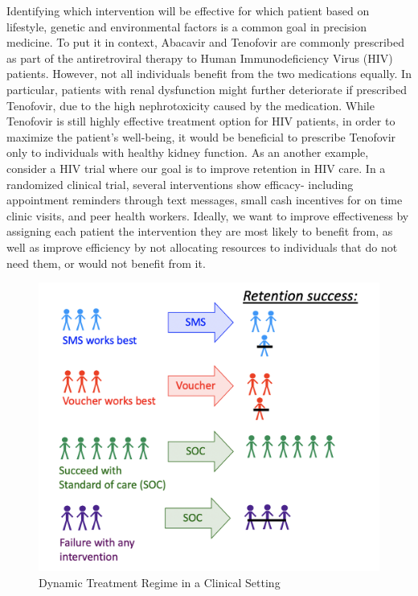 \documentclass[
  12pt, krantz2,
]{krantz}
\theoremstyle{definition}
\theoremstyle{definition}
\theoremstyle{definition}
\newcommand{\1}{\mathbbm{1}}
\begin{document}
Identifying which intervention will be effective for which patient based on
lifestyle, genetic and environmental factors is a common goal in precision
medicine. To put it in context, Abacavir and Tenofovir are commonly prescribed
as part of the antiretroviral therapy to Human Immunodeficiency Virus (HIV)
patients. However, not all individuals benefit from the two medications equally.
In particular, patients with renal dysfunction might further deteriorate if
prescribed Tenofovir, due to the high nephrotoxicity caused by the medication.
While Tenofovir is still highly effective treatment option for HIV patients, in
order to maximize the patient's well-being, it would be beneficial to prescribe
Tenofovir only to individuals with healthy kidney function. As an another example,
consider a HIV trial where our goal is to improve retention in HIV care.
In a randomized clinical trial, several interventions show efficacy- including
appointment reminders through text messages, small cash incentives for on time
clinic visits, and peer health workers. Ideally, we want to improve effectiveness
by assigning each patient the intervention they are most likely to benefit from,
as well as improve efficiency by not allocating resources to individuals that do not need
them, or would not benefit from it.

\begin{figure}

{\centering \includegraphics[width=0.8\linewidth]{img/png/DynamicA_Illustration} 

}

\caption{Dynamic Treatment Regime in a Clinical Setting}\label{fig:unnamed-chunk-1}
\end{figure}
\end{document}
